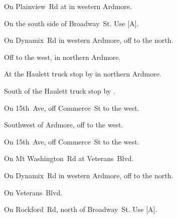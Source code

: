 
\begin{LocationList}

On Plainview~Rd at  in western Ardmore.

On the south side of Broadway~St.
Use  [A].

On Dynamix~Rd in western Ardmore, off  to the north.

Off   to the west, in northern Ardmore.

At the Haulett truck stop by   in northern Ardmore.

South of the Haulett truck stop by  .

On 15th~Ave, off  Commerce~St to the west.

Southwest of Ardmore, off   to the west.

\Location{\RecruitmentAgency \Recruitment}
On 15th~Ave, off  Commerce~St to the west.

On Mt Washington~Rd at  Veterans~Blvd.

On Dynamix~Rd in western Ardmore, off  to the north.

On  Veterans~Blvd.

On Rockford~Rd, north of Broadway~St.
Use  [A].

\end{LocationList}
